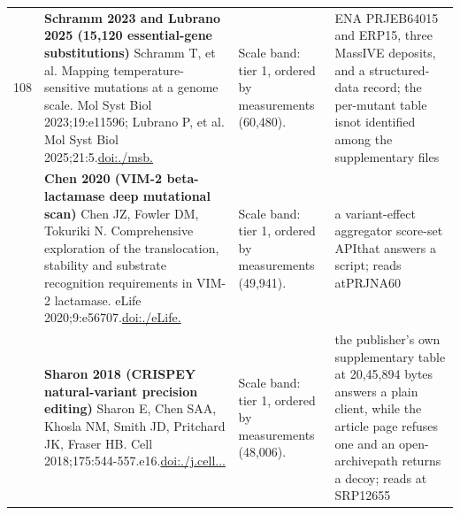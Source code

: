 \begin{landscape}
\begin{longtable}{@{}r@{\hspace{4pt}} L{78mm} L{72mm} L{76mm}@{}}
108 & \textbf{Schramm 2023 and Lubrano 2025 (15,120 essential-gene substitutions)} \newline Schramm T, et al. Mapping temperature-sensitive mutations at a genome scale. Mol Syst Biol 2023;19:e11596; Lubrano P, et al. Mol Syst Biol 2025;21:5.\newline \href{https://doi.org/10.15252/msb.202311596}{doi:./\allowbreak msb.} & Scale band: tier 1, ordered by measurements (60,480). & ENA PRJE\allowbreak B64015 a\allowbreak nd ERP15, th\allowbreak ree Mass\allowbreak IVE depo\allowbreak sits, an\allowbreak d a stru\allowbreak ctured-\allowbreak data re\allowbreak cord; th\allowbreak e per-\allowbreak mutant \allowbreak table is\allowbreak  not ide\allowbreak ntified \allowbreak among th\allowbreak e supple\allowbreak mentary \allowbreak files \\
 & \textbf{Chen 2020 (VIM-2 beta-lactamase deep mutational scan)} \newline Chen JZ, Fowler DM, Tokuriki N. Comprehensive exploration of the translocation, stability and substrate recognition requirements in VIM-2 lactamase. eLife 2020;9:e56707.\newline \href{https://doi.org/10.7554/eLife.56707}{doi:./\allowbreak eLife.} & Scale band: tier 1, ordered by measurements (49,941). & a varian\allowbreak t-\allowbreak effect \allowbreak aggregat\allowbreak or score\allowbreak -\allowbreak set API\allowbreak  that an\allowbreak swers a \allowbreak script; \allowbreak reads at\allowbreak  PRJNA60 \\
 & \textbf{Sharon 2018 (CRISPEY natural-variant precision editing)} \newline Sharon E, Chen SAA, Khosla NM, Smith JD, Pritchard JK, Fraser HB. Cell 2018;175:544-557.e16.\newline \href{https://doi.org/10.1016/j.cell.2018.08.057}{doi:./\allowbreak j.\allowbreak cell...} & Scale band: tier 1, ordered by measurements (48,006). & the publ\allowbreak isher's \allowbreak own supp\allowbreak lementar\allowbreak y table \allowbreak at 20,45,894 by\allowbreak tes answ\allowbreak ers a pl\allowbreak ain clie\allowbreak nt, whil\allowbreak e the ar\allowbreak ticle pa\allowbreak ge refus\allowbreak es one a\allowbreak nd an op\allowbreak en-\allowbreak archive\allowbreak  path re\allowbreak turns a \allowbreak decoy; r\allowbreak eads at \allowbreak SRP12655 \\

\end{longtable}
\end{landscape}
